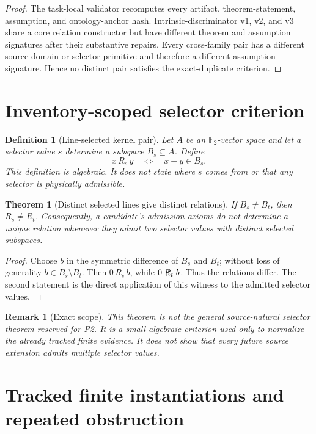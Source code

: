 \documentclass[11pt]{article}
\newtheorem{definition}{Definition}
\newtheorem{theorem}{Theorem}
\newtheorem{remark}{Remark}
\newcommand{\Ftwo}{\mathbb F_2}
\begin{document}
\begin{proof}
The task-local validator recomputes every artifact, theorem-statement,
assumption, and ontology-anchor hash. Intrinsic-discriminator v1, v2, and v3
share a core relation constructor but have different theorem and assumption
signatures after their substantive repairs. Every cross-family pair has a
different source domain or selector primitive and therefore a different
assumption signature. Hence no distinct pair satisfies the exact-duplicate
criterion.
\end{proof}

\section{Inventory-scoped selector criterion}

\begin{definition}[Line-selected kernel pair]
Let $A$ be an $\Ftwo$-vector space and let a selector value $s$ determine a
subspace $B_s\subseteq A$. Define
\[
 x\,R_s\,y\quad\Longleftrightarrow\quad x-y\in B_s.
\]
This definition is algebraic. It does not state where $s$ comes from or that
any selector is physically admissible.
\end{definition}

\begin{theorem}[Distinct selected lines give distinct relations]
If $B_s\ne B_t$, then $R_s\ne R_t$. Consequently, a candidate's admission
axioms do not determine a unique relation whenever they admit two selector
values with distinct selected subspaces.
\end{theorem}

\begin{proof}
Choose $b$ in the symmetric difference of $B_s$ and $B_t$; without loss of
generality $b\in B_s\setminus B_t$. Then $0\,R_s\,b$, while
$0\not\mathrel{R_t}b$. Thus the relations differ. The second statement is
the direct application of this witness to the admitted selector values.
\end{proof}

\begin{remark}[Exact scope]
This theorem is not the general source-natural selector theorem reserved for
P2. It is a small algebraic criterion used only to normalize the already
tracked finite evidence. It does not show that every future source extension
admits multiple selector values.
\end{remark}

\section{Tracked finite instantiations and repeated obstruction}
\end{document}
